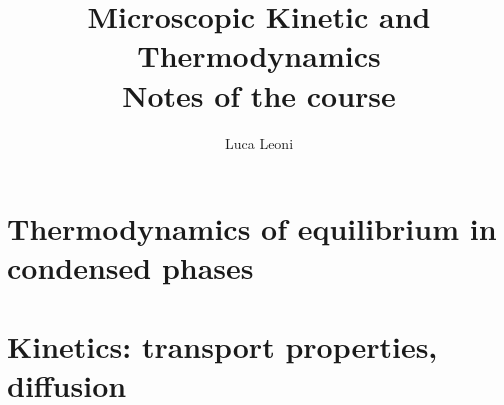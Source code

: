 \documentclass[12pt]{report}
\title{\Huge{Microscopic Kinetic and Thermodynamics}\\Notes of the course}
\author{\huge{Luca Leoni}}
\date{}
\begin{document}
    \maketitle

    \tableofcontents

    \chapter{Thermodynamics of equilibrium in condensed phases}
    
    
    
    

    \chapter{Kinetics: transport properties, diffusion}
    
    
    
\end{document}
